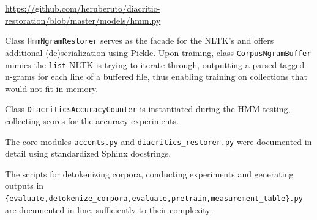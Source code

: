 \documentclass[12pt]{article}
\begin{document}
    \noindent\url{https://github.com/heruberuto/diacritic-restoration/blob/master/models/hmm.py}

    Class \texttt{HmmNgramRestorer} serves as the facade for the \textsf{NLTK}'s and offers additional (de)serialization
    using \textsf{Pickle}.
    Upon training, class \texttt{CorpusNgramBuffer} mimics the \texttt{list} \textsf{NLTK} is trying to
    iterate through, outputting a parsed tagged n-grams for each line of a buffered file, thus enabling training on collections that would not fit in memory.

    Class \texttt{DiacriticsAccuracyCounter} is instantiated during the HMM testing, collecting scores for the
    accuracy experiments.

    The core modules \texttt{accents.py} and \texttt{diacritics\_restorer.py} were documented in detail using
    standardized Sphinx docstrings.

    The scripts for detokenizing corpora, conducting experiments and generating outputs in \texttt{\{evaluate,detokenize\_corpora,evaluate,pretrain,measurement\_table\}.py}
    are documented in-line, sufficiently to their complexity.
\end{document}
